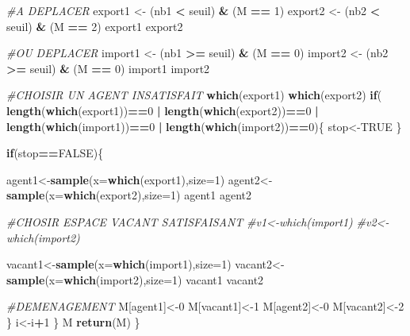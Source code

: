 \documentclass[
]{article}
\newenvironment{Shaded}{\begin{snugshade}}{\end{snugshade}}
\newcommand{\CommentTok}[1]{\textcolor[rgb]{0.56,0.35,0.01}{\textit{#1}}}
\newcommand{\ControlFlowTok}[1]{\textcolor[rgb]{0.13,0.29,0.53}{\textbf{#1}}}
\newcommand{\DataTypeTok}[1]{\textcolor[rgb]{0.13,0.29,0.53}{#1}}
\newcommand{\DecValTok}[1]{\textcolor[rgb]{0.00,0.00,0.81}{#1}}
\newcommand{\KeywordTok}[1]{\textcolor[rgb]{0.13,0.29,0.53}{\textbf{#1}}}
\newcommand{\NormalTok}[1]{#1}
\newcommand{\OperatorTok}[1]{\textcolor[rgb]{0.81,0.36,0.00}{\textbf{#1}}}
\newcommand{\OtherTok}[1]{\textcolor[rgb]{0.56,0.35,0.01}{#1}}
\newcommand{\StringTok}[1]{\textcolor[rgb]{0.31,0.60,0.02}{#1}}
\begin{document}
\begin{Shaded}
\begin{Highlighting}[]
\CommentTok{#A DEPLACER}
\NormalTok{export1 <-}\StringTok{ }\NormalTok{(nb1 }\OperatorTok{<}\StringTok{ }\NormalTok{seuil) }\OperatorTok{&}\StringTok{ }\NormalTok{(M }\OperatorTok{==}\StringTok{ }\DecValTok{1}\NormalTok{)}
\NormalTok{export2 <-}\StringTok{ }\NormalTok{(nb2 }\OperatorTok{<}\StringTok{ }\NormalTok{seuil) }\OperatorTok{&}\StringTok{ }\NormalTok{(M }\OperatorTok{==}\StringTok{ }\DecValTok{2}\NormalTok{)}
\NormalTok{export1}
\NormalTok{export2}

\CommentTok{#OU DEPLACER}
\NormalTok{import1 <-}\StringTok{ }\NormalTok{(nb1 }\OperatorTok{>=}\StringTok{ }\NormalTok{seuil) }\OperatorTok{&}\StringTok{ }\NormalTok{(M }\OperatorTok{==}\StringTok{ }\DecValTok{0}\NormalTok{)}
\NormalTok{import2 <-}\StringTok{ }\NormalTok{(nb2 }\OperatorTok{>=}\StringTok{ }\NormalTok{seuil) }\OperatorTok{&}\StringTok{ }\NormalTok{(M }\OperatorTok{==}\StringTok{ }\DecValTok{0}\NormalTok{)}
\NormalTok{import1}
\NormalTok{import2}


\CommentTok{#CHOISIR UN AGENT INSATISFAIT}
\KeywordTok{which}\NormalTok{(export1)}
\KeywordTok{which}\NormalTok{(export2)}
\ControlFlowTok{if}\NormalTok{( }\KeywordTok{length}\NormalTok{(}\KeywordTok{which}\NormalTok{(export1))}\OperatorTok{==}\DecValTok{0} \OperatorTok{|}\StringTok{ }\KeywordTok{length}\NormalTok{(}\KeywordTok{which}\NormalTok{(export2))}\OperatorTok{==}\DecValTok{0} \OperatorTok{|}\StringTok{ }\KeywordTok{length}\NormalTok{(}\KeywordTok{which}\NormalTok{(import1))}\OperatorTok{==}\DecValTok{0} \OperatorTok{|}\StringTok{ }\KeywordTok{length}\NormalTok{(}\KeywordTok{which}\NormalTok{(import2))}\OperatorTok{==}\DecValTok{0}\NormalTok{)\{}
\NormalTok{  stop<-}\OtherTok{TRUE}
\NormalTok{\}}
  
\ControlFlowTok{if}\NormalTok{(stop}\OperatorTok{==}\OtherTok{FALSE}\NormalTok{)\{}

\NormalTok{agent1<-}\KeywordTok{sample}\NormalTok{(}\DataTypeTok{x=}\KeywordTok{which}\NormalTok{(export1),}\DataTypeTok{size=}\DecValTok{1}\NormalTok{)}
\NormalTok{agent2<-}\KeywordTok{sample}\NormalTok{(}\DataTypeTok{x=}\KeywordTok{which}\NormalTok{(export2),}\DataTypeTok{size=}\DecValTok{1}\NormalTok{)}
\NormalTok{agent1}
\NormalTok{agent2}

\CommentTok{#CHOSIR ESPACE VACANT SATISFAISANT}
\CommentTok{#v1<-which(import1)}
\CommentTok{#v2<-which(import2)}

\NormalTok{vacant1<-}\KeywordTok{sample}\NormalTok{(}\DataTypeTok{x=}\KeywordTok{which}\NormalTok{(import1),}\DataTypeTok{size=}\DecValTok{1}\NormalTok{)}
\NormalTok{vacant2<-}\KeywordTok{sample}\NormalTok{(}\DataTypeTok{x=}\KeywordTok{which}\NormalTok{(import2),}\DataTypeTok{size=}\DecValTok{1}\NormalTok{)}
\NormalTok{vacant1}
\NormalTok{vacant2}

\CommentTok{#DEMENAGEMENT }
\NormalTok{M[agent1]<-}\DecValTok{0}
\NormalTok{M[vacant1]<-}\DecValTok{1}
\NormalTok{M[agent2]<-}\DecValTok{0}
\NormalTok{M[vacant2]<-}\DecValTok{2}
\NormalTok{\}}
\NormalTok{i<-i}\OperatorTok{+}\DecValTok{1}
\NormalTok{\}}
\NormalTok{M}
\KeywordTok{return}\NormalTok{(M)}
\NormalTok{\}}
\end{Highlighting}
\end{Shaded}
\end{document}
